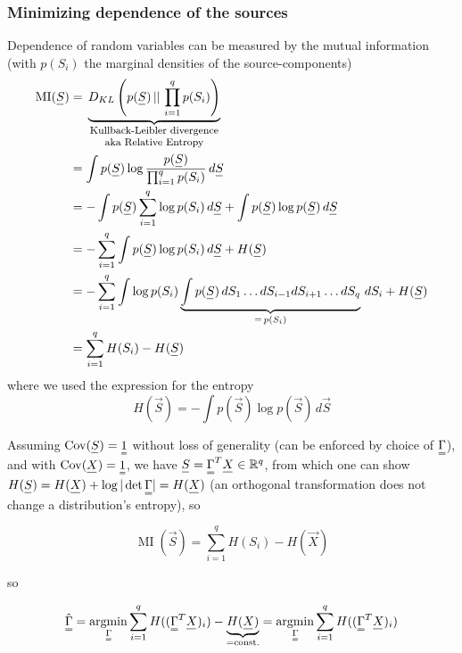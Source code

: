 \subsubsection{Minimizing dependence of the sources}
Dependence of random variables can be measured by the mutual information (with $p(S_i)$ the marginal
densities of the source-components)
\begin{equation}
    \begin{aligned}
        \operatorname{MI}(\vec{S}) &= \explain{D_{KL}\left( p(\vec{S}) \, || \, \prod_{i=1}^q p(S_i) \right)}{Kullback-Leibler divergence aka Relative Entropy} \\
        &= \int p(\vec{S}) \log \frac{p(\vec{S})}{\prod_{i=1}^q p(S_i)} \, d\vec{S} \\
        &= -\int p(\vec{S}) \sum_{i=1}^{q} \log p(S_i) \, d\vec{S} + \int p(\vec{S}) \log p(\vec{S}) \, d\vec{S} \\
        &= -\sum_{i=1}^{q} \int p(\vec{S}) \log p(S_i) \, d\vec{S} + H(\vec{S}) \\
        &= -\sum_{i=1}^{q} \int \log p(S_i) \underbrace{\int p(\vec{S}) \, dS_1 \dots dS_{i-1} dS_{i+1} \dots dS_q}_{=\, p(S_i)} \, dS_i + H(\vec{S}) \\
        &= \sum_{i=1}^{q} H(S_i) - H(\vec{S})
    \end{aligned}
\end{equation}
where we used the expression for the entropy
\begin{equation}
    H(\vec{S}) = - \int p(\vec{S}) \log p(\vec{S}) \, d\vec{S}
\end{equation}

Assuming $\Cov(\vec{S}) = \mat{1}$ without loss of generality (can be enforced by choice of $\mat{\Gamma}$), and
with $\Cov(\vec{X}) = \mat{1}$, we have $\vec{S} = \mat{\Gamma}^T \vec{X} \in \mathbb{R}^{q}$, from which
one can show $H(\vec{S}) = H(\vec{X}) + \log |\det \mat{\Gamma}| = H(\vec{X})$ (\textcolor{blue1}{an orthogonal
transformation does not change a distribution's entropy}), so

\begin{equation}
    \operatorname{MI}(\vec{S}) = \sum_{i=1}^{q} H(S_i) - H(\vec{X})
\end{equation}

so

\begin{equation}
    \mat{\hat{\Gamma}} = \argmin_{\mat{\Gamma}} \sum_{i=1}^{q} H((\mat{\Gamma}^T \vec{X})_i) - \underbrace{H(\vec{X})}_{=\text{const.}} = \argmin_{\mat{\Gamma}} \sum_{i=1}^{q} H((\mat{\Gamma}^T \vec{X})_i)
\end{equation}

